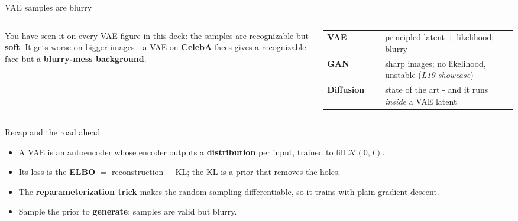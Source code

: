 \documentclass[aspectratio=169]{beamer}
\begin{document}
\begin{frame}{VAE samples are blurry}
  \begin{columns}[T]
    \small
    You have seen it on every VAE figure in this deck: the samples are recognizable but
    \textbf{soft}. It gets worse on bigger images - a VAE on \textbf{CelebA} faces gives a
    recognizable face but a \textbf{blurry-mess background}.
    \vskip 5pt
    \begin{tabular}{@{}p{0.28\linewidth}p{0.64\linewidth}@{}}
      \small\textbf{VAE} & \small principled latent + likelihood; blurry \\[4pt]
      \small\textbf{GAN} & \small sharp images; no likelihood, unstable (\emph{L19 showcase}) \\[4pt]
      \small\textbf{Diffusion} & \small state of the art - and it runs \emph{inside} a VAE latent \\
    \end{tabular}
  \end{columns}
\end{frame}

\begin{frame}{Recap and the road ahead}
  \small
  \begin{itemize}
    \item A VAE is an autoencoder whose encoder outputs a \textbf{distribution} per input,
      trained to fill $\mathcal{N}(0,I)$.
    \item Its loss is the \textbf{ELBO} $=$ reconstruction $-$ KL; the KL is a prior that
      removes the holes.
    \item The \textbf{reparameterization trick} makes the random sampling differentiable,
      so it trains with plain gradient descent.
    \item Sample the prior to \textbf{generate}; samples are valid but blurry.
  \end{itemize}
  \vskip 6pt
\end{frame}
\end{document}
